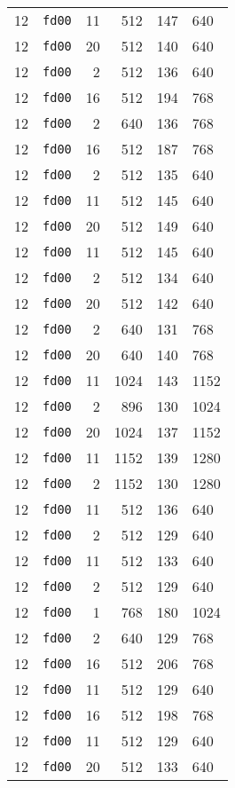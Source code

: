 \documentclass{article}
\begin{document}
\begin{table}[h!]
\begin{tabular}{llrrrl}
    12 & \texttt{fd00} & 11 & 512 & 147 & 640 \\
    12 & \texttt{fd00} & 20 & 512 & 140 & 640 \\
    12 & \texttt{fd00} & 2 & 512 & 136 & 640 \\
    12 & \texttt{fd00} & 16 & 512 & 194 & 768 \\
    12 & \texttt{fd00} & 2 & 640 & 136 & 768 \\
    12 & \texttt{fd00} & 16 & 512 & 187 & 768 \\
    12 & \texttt{fd00} & 2 & 512 & 135 & 640 \\
    12 & \texttt{fd00} & 11 & 512 & 145 & 640 \\
    12 & \texttt{fd00} & 20 & 512 & 149 & 640 \\
    12 & \texttt{fd00} & 11 & 512 & 145 & 640 \\
    12 & \texttt{fd00} & 2 & 512 & 134 & 640 \\
    12 & \texttt{fd00} & 20 & 512 & 142 & 640 \\
    12 & \texttt{fd00} & 2 & 640 & 131 & 768 \\
    12 & \texttt{fd00} & 20 & 640 & 140 & 768 \\
    12 & \texttt{fd00} & 11 & 1024 & 143 & 1152 \\
    12 & \texttt{fd00} & 2 & 896 & 130 & 1024 \\
    12 & \texttt{fd00} & 20 & 1024 & 137 & 1152 \\
    12 & \texttt{fd00} & 11 & 1152 & 139 & 1280 \\
    12 & \texttt{fd00} & 2 & 1152 & 130 & 1280 \\
    12 & \texttt{fd00} & 11 & 512 & 136 & 640 \\
    12 & \texttt{fd00} & 2 & 512 & 129 & 640 \\
    12 & \texttt{fd00} & 11 & 512 & 133 & 640 \\
    12 & \texttt{fd00} & 2 & 512 & 129 & 640 \\
    12 & \texttt{fd00} & 1 & 768 & 180 & 1024 \\
    12 & \texttt{fd00} & 2 & 640 & 129 & 768 \\
    12 & \texttt{fd00} & 16 & 512 & 206 & 768 \\
    12 & \texttt{fd00} & 11 & 512 & 129 & 640 \\
    12 & \texttt{fd00} & 16 & 512 & 198 & 768 \\
    12 & \texttt{fd00} & 11 & 512 & 129 & 640 \\
    12 & \texttt{fd00} & 20 & 512 & 133 & 640 \\

\end{tabular}
\end{table}
\end{document}
